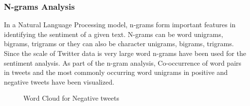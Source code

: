 \documentclass[9pt,twocolumn,twoside]{styles/osajnl}
\begin{document}
\subsubsection{N-grams Analysis}
In a Natural Language Processing model, n-grams form important features in identifying the sentiment of a  given text. N-grams can be word unigrams, bigrams, trigrams or they can also be character unigrams, bigrams, trigrams. Since the scale of Twitter data is very large word n-grams have been used for the sentiment analysis. As part of the n-gram analysis, Co-occurrence of word pairs in tweets and the most commonly occurring word unigrams in positive and negative tweets have been visualized. 
    \begin{figure}[htbp]
    \centering
    \caption{Word Cloud for Negative tweets}
    \label{fig:negwordcloud}
    \end{figure}
\end{document}
